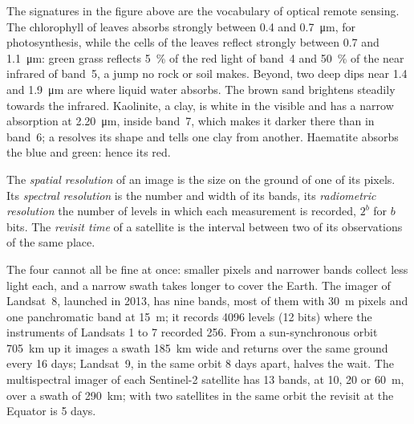 The signatures in the figure above are the vocabulary of optical remote
sensing. The chlorophyll of leaves absorbs strongly between 0.4 and
\qty{0.7}{\micro\metre}, for photosynthesis, while the cells of the leaves
reflect strongly between 0.7 and \qty{1.1}{\micro\metre}: green grass
reflects \qty{5}{\percent} of the red light of band~4 and \qty{50}{\percent}
of the near infrared of band~5, a jump no rock or soil makes. Beyond, two
deep dips near 1.4 and \qty{1.9}{\micro\metre} are where liquid water
absorbs. The brown sand brightens steadily towards the infrared. Kaolinite,
a clay, is white in the visible and has a narrow absorption at
\qty{2.20}{\micro\metre}, inside band~7, which makes it darker there than
in band~6; a  resolves its shape and tells one clay from
another. Haematite absorbs the blue and green: hence its red.

\begin{definition}\label{def:b3:remote-sensing-gis:resolutions}
The \emph{spatial resolution} of an image is the
size on the ground of one of its pixels. Its \emph{spectral
resolution} is the number and width of its
bands, its \emph{radiometric resolution} the
number of levels in which each measurement is recorded, $2^b$ for $b$ bits.
The \emph{revisit time} of a satellite is the interval
between two of its observations of the same place.
\end{definition}

The four cannot all be fine at once: smaller pixels and narrower bands
collect less light each, and a narrow swath takes longer to cover the
Earth. The imager of Landsat~8, launched in 2013, has nine bands, most of
them with \qty{30}{m} pixels and one panchromatic band at \qty{15}{m}; it
records 4096 levels (12 bits) where the instruments of Landsats 1 to 7
recorded 256. From a sun-synchronous orbit \qty{705}{km} up it images a
swath \qty{185}{km} wide and returns over the same ground every 16 days;
Landsat~9, in the same orbit 8 days apart, halves the wait. The
multispectral imager of each Sentinel-2 satellite has 13 bands, at 10, 20
or \qty{60}{m}, over a swath of \qty{290}{km}; with two satellites in the
same orbit the revisit at the Equator is 5 days.

